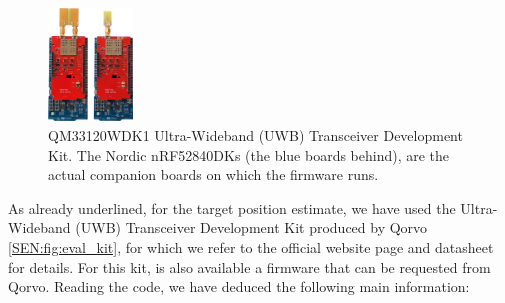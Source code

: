 \begin{figure}
    \centering
    \includegraphics[width=0.2\textwidth]{images/characterization/QM33120WDK1_PDP_v2.png}
    \caption{QM33120WDK1 Ultra-Wideband (UWB) Transceiver Development Kit. The Nordic nRF52840DKs (the blue boards behind), are the actual companion boards on which the firmware runs.}
    \label{SEN:fig:eval_kit}
\end{figure}

As already underlined, for the target position estimate, we have used the Ultra-Wideband (UWB) Transceiver Development Kit produced by Qorvo \autoref{SEN:fig:eval_kit}, for which we refer to the official website page \cite{UWBQorvo} and datasheet \cite{UWBDatasheet} for details. For this kit, is also available a firmware that can be requested from Qorvo. Reading the code, we have deduced the following main information:
